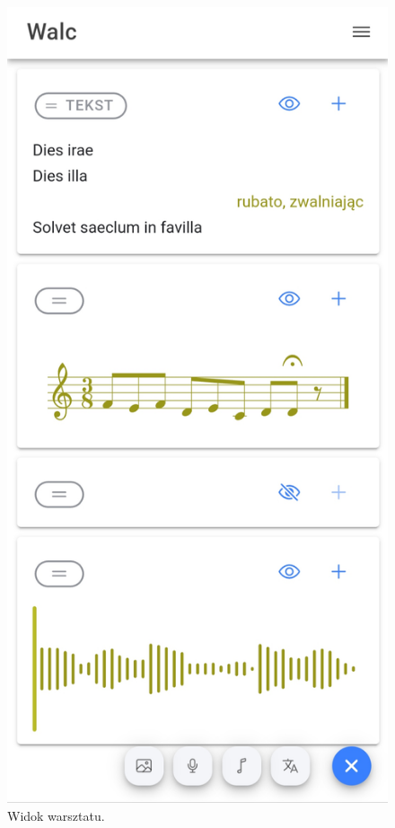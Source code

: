 \begin{figure}[H]
	\begin{center}
		\includegraphics[scale=0.12]{media/WorkshopView.jpg}
	\end{center}
	\caption{Widok warsztatu.}
	\label{rys:workshop-view}
\end{figure}

